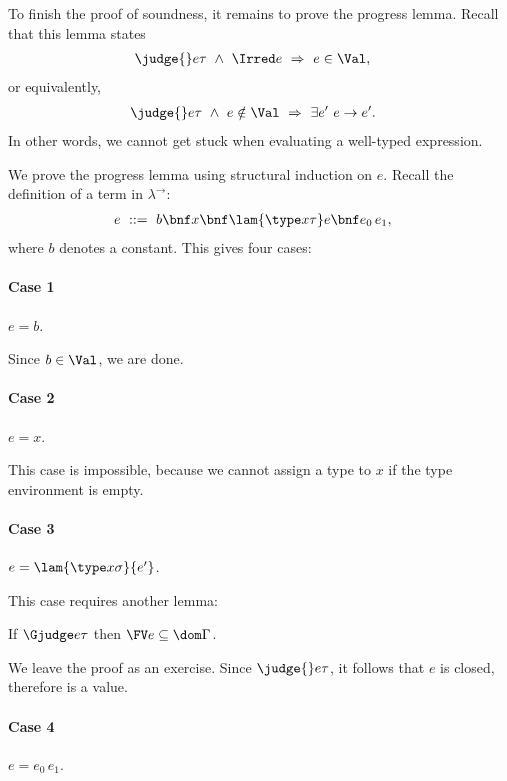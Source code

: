 To finish the proof of soundness, it remains to prove the progress lemma. Recall that this lemma states
\begin{align*}
\judge{}e\tau\ \wedge\ \Irred e\ &\Rightarrow\ e\in\Val,
\end{align*}
or equivalently,
\begin{align*}
\judge{}e\tau\ \wedge\ e\notin\Val\ &\Rightarrow\ \exists e'\ e\to e'.
\end{align*}
In other words, we cannot get stuck when evaluating a well-typed expression.

We prove the progress lemma using structural induction on $e$.
Recall the definition of a term in $\lambda^\to$:
\begin{align*}
e\ &::=\ b \bnf x \bnf \lam{\type x\tau}e \bnf e_0\,e_1,
\end{align*}
where $b$ denotes a constant. This gives four cases:

\paragraph{Case 1} $e=b$.

Since $b\in\Val$, we are done.

\paragraph{Case 2} $e=x$.

This case is impossible, because we cannot assign a type to $x$ if the type environment is empty.

\paragraph{Case 3} $e=\lam{\type x\sigma}{e'}$.

This case requires another lemma:
\begin{lemma}
If $\Gjudge e\tau$ then $\FV e\subseteq\dom\Gamma$.
\end{lemma}
We leave the proof as an exercise. Since $\judge{}e\tau$, it follows that $e$ is closed, therefore is a value.

\paragraph{Case 4} $e=e_0\,e_1$.

